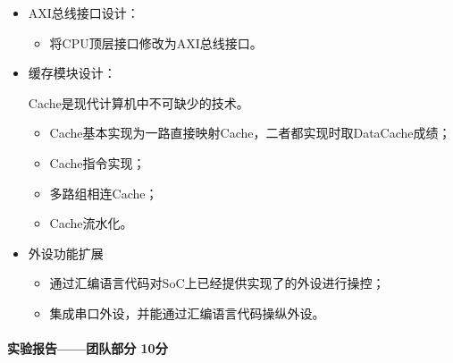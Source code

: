\begin{itemize}
    \item AXI总线接口设计：
    \begin{itemize}
        \item 将CPU顶层接口修改为AXI总线接口。
    \end{itemize}
    \item 缓存模块设计：
    
    Cache是现代计算机中不可缺少的技术。

    \begin{itemize}
        \item Cache基本实现为一路直接映射Cache，二者都实现时取DataCache成绩；
        \item Cache指令实现；
        \item 多路组相连Cache；
        \item Cache流水化。
    \end{itemize}
    \item 外设功能扩展
    \begin{itemize}
        \item 通过汇编语言代码对SoC上已经提供实现了的外设进行操控；
        \item 集成串口外设，并能通过汇编语言代码操纵外设。
    \end{itemize}
\end{itemize}

\paragraph{实验报告——团队部分 10分}



